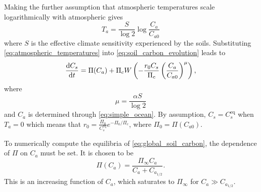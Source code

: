 Making the further assumption that atmospheric temperatures scale logarithmically with atmospheric  \parencite{Pierrehumbert2010} gives
\begin{equation}
  \label{eq:atmospheric_temperatures}
  T_a = \frac{S}{\log 2} \log \frac{C_a}{C_{a0}} 
\end{equation}
where $S$ is the effective climate sensitivity experienced by the soils. Substituting \cref{eq:atmospheric_temperatures} into \cref{eq:soil_carbon_evolution} 
leads to
\begin{equation}
  \label{eq:global_soil_carbon}
  \dv{C_s}{t} = \Pi(C_a) + \Pi_c W\left(-\frac{r_0C_s}{\Pi_c} \left(\frac{C_a}{C_{a0}}\right)^\mu \right),
\end{equation}
where
\begin{equation}
  \label{eq:mu}
  \mu = \frac{\alpha S}{\log 2}
\end{equation}
and $C_a$ is determined through \cref{eq:simple_ocean}. By assumption, $C_s = C_s^{\mathrm{eq}}$ when $T_a = 0$ which means that 
$r_0 = \frac{\Pi_0}{C_s^{\mathrm{eq}}}e^{-\Pi_0/\Pi_c}$, where $\Pi_0 = \Pi\left(C_{a0}\right)$.

To numerically compute the equilibria of \cref{eq:global_soil_carbon}, the dependence of $\Pi$ on
$C_a$  must be set. It is chosen to be
\begin{equation}
  \label{eq:npp_fertilization}
  \Pi(C_a) = \frac{\Pi_{\infty} C_a}{C_a + C_{a_{1/2}}}.
\end{equation}
This is an increasing function of $C_a$, which saturates to $\Pi_{\infty}$ for $C_a \gg C_{a_{1/2}}$.

